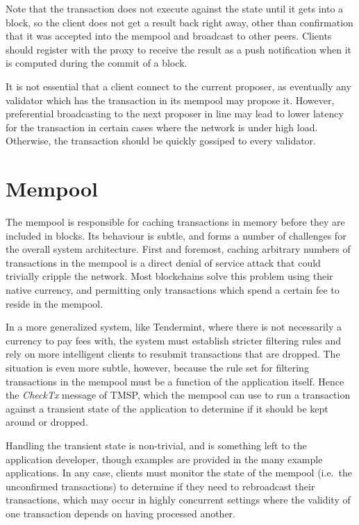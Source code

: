 Note that the transaction does not execute against the state until it gets into a block,
so the client does not get a result back right away, other than confirmation that it was accepted into the mempool and broadcast to other peers.
Clients should register with the proxy to receive the result as a push notification when it is computed during the commit of a block.

It is not essential that a client connect to the current proposer, 
as eventually any validator which has the transaction in its mempool may propose it.
However, preferential broadcasting to the next proposer in line may lead to lower latency for the transaction
in certain cases where the network is under high load. Otherwise, the transaction should be quickly gossiped to every validator.

\section{Mempool}

The mempool is responsible for caching transactions in memory before they are included in blocks.
Its behaviour is subtle, and forms a number of challenges for the overall system architecture.
First and foremost, caching arbitrary numbers of transactions in the mempool is a direct denial of service attack
that could trivially cripple the network. Most blockchains solve this problem using their native currency,
and permitting only transactions which spend a certain fee to reside in the mempool.

In a more generalized system, like Tendermint, where there is not necessarily a currency to pay fees with,
the system must establish stricter filtering rules and rely on more intelligent clients to resubmit transactions that are dropped.
The situation is even more subtle, however, because the rule set for filtering transactions in the mempool must be a function of the application itself.
Hence the \emph{CheckTx} message of TMSP,
which the mempool can use to run a transaction against a transient state of the application to determine if it should be kept around or dropped.

Handling the transient state is non-trivial, and is something left to the application developer, 
though examples are provided in the many example applications. 
In any case, clients must monitor the state of the mempool (i.e.~the unconfirmed transactions) to determine if they need to rebroadcast their transactions,
which may occur in highly concurrent settings where the validity of one transaction depends on having processed another.

